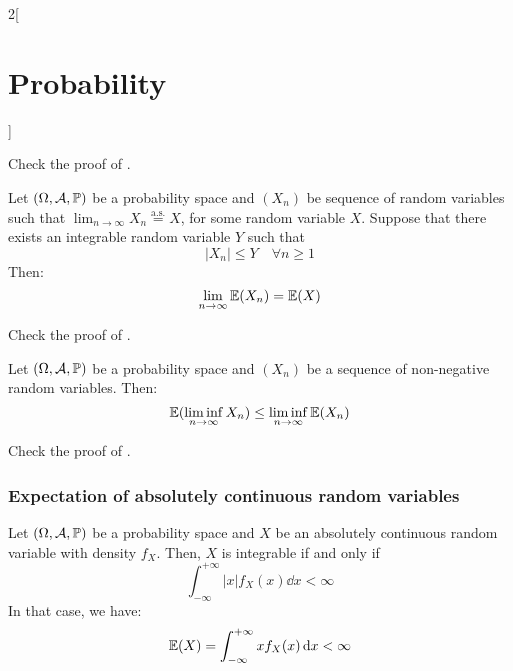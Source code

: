 \documentclass[../../../main_math.tex]{subfiles}
\begin{document}
\begin{multicols}{2}[\section{Probability}]
\begin{theorem}
  \end{theorem}
  \begin{sproof}
    Check the proof of .
  \end{sproof}
  \begin{theorem}\label{P:dominated}
    Let $(\Omega,\mathcal{A},\mathbb{P})$ be a probability space and $(X_n)$ be sequence of random variables such that $\displaystyle\lim_{n\to\infty}X_n\overset{\text{a.s.}}{=}X$, for some random variable $X$. Suppose that there exists an integrable random variable $Y$ such that $$|X_n|\leq Y\quad\forall n\geq 1$$ Then: $$\lim_{n\to\infty} \mathbb{E}(X_n)=\mathbb{E}(X)$$
  \end{theorem}
  \begin{sproof}
    Check the proof of .
  \end{sproof}
  \begin{theorem}
    Let $(\Omega,\mathcal{A},\mathbb{P})$ be a probability space and $(X_n)$ be a sequence of non-negative random variables. Then: $$\mathbb{E}(\liminf_{n\to\infty}X_n)\leq \liminf_{n\to\infty}\mathbb{E}(X_n)$$
  \end{theorem}
  \begin{sproof}
    Check the proof of .
  \end{sproof}
  \subsubsection{Expectation of absolutely continuous random variables}
  \begin{theorem}
    Let $(\Omega,\mathcal{A},\mathbb{P})$ be a probability space and $X$ be an absolutely continuous random variable with density $f_X$. Then, $X$ is integrable if and only if $$\int_{-\infty}^{+\infty}|x|f_X(x)\dd{x}<\infty$$
    In that case, we have: $$\mathbb{E}(X)=\int_{-\infty}^{+\infty}xf_X(x)\dd{x}<\infty$$
  \end{theorem}

\end{multicols}
\end{document}
